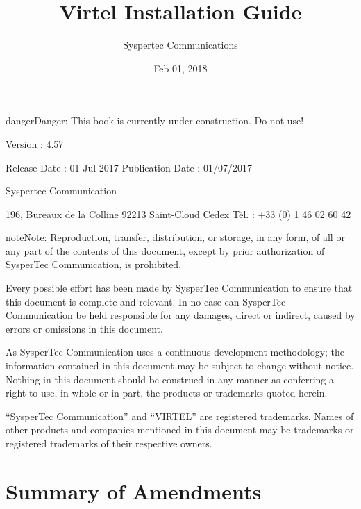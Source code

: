 \documentclass[letterpaper,10pt,english]{sphinxmanual}
\title{Virtel Installation Guide}
\date{Feb 01, 2018}
\author{Syspertec Communications}
\begin{document}
\maketitle
\sphinxtableofcontents
{}\label{\detokenize{Installation_Guide::doc}}




\begin{sphinxadmonition}{danger}{Danger:}
This book is currently under construction. Do not use!
\end{sphinxadmonition}

Version : 4.57

Release Date : 01 Jul 2017 Publication Date : 01/07/2017

Syspertec Communication

196, Bureaux de la Colline 92213 Saint-Cloud Cedex Tél. : +33 (0) 1 46 02 60 42


\begin{sphinxadmonition}{note}{Note:}
Reproduction, transfer, distribution, or storage, in any form, of all or any part of
the contents of this document, except by prior authorization of SysperTec
Communication, is prohibited.

Every possible effort has been made by SysperTec Communication to ensure that this document
is complete and relevant. In no case can SysperTec Communication be held responsible for
any damages, direct or indirect, caused by errors or omissions in this document.

As SysperTec Communication uses a continuous development methodology; the information
contained in this document may be subject to change without notice. Nothing in this
document should be construed in any manner as conferring a right to use, in whole or in
part, the products or trademarks quoted herein.

“SysperTec Communication” and “VIRTEL” are registered trademarks. Names of other products
and companies mentioned in this document may be trademarks or registered trademarks of
their respective owners.
\end{sphinxadmonition}

\newpage


\chapter{Summary of Amendments}
\label{\detokenize{Installation_Guide:summary-of-amendments}}\label{\detokenize{Installation_Guide:virtel457ig}}\label{\detokenize{Installation_Guide:v457ig-summary-of-ammendments}}\label{\detokenize{Installation_Guide:installation-guide-v4-57}}
\end{document}
